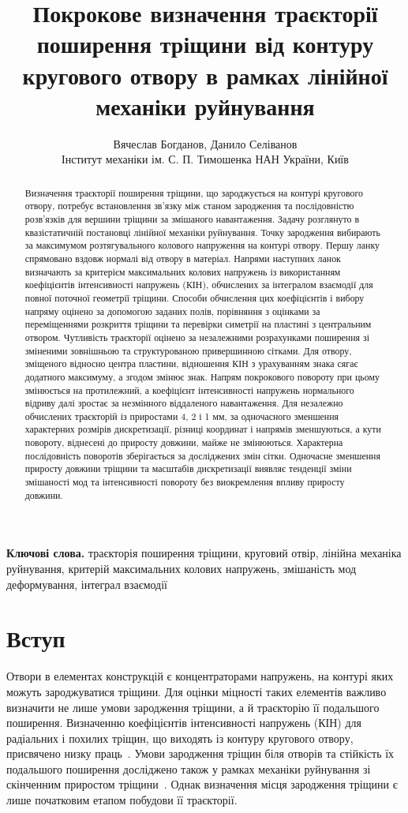 \documentclass[a4paper,12pt]{article}
\title{Покрокове визначення траєкторії поширення тріщини від контуру кругового отвору в рамках лінійної
механіки руйнування}
\author{Вячеслав Богданов, Данило Селіванов\\[4pt]
  \small Інститут механіки ім. С. П. Тимошенка НАН України, Київ}
\date{}
\begin{document}
\maketitle


\begin{abstract}
Визначення траєкторії поширення тріщини, що зароджується на контурі кругового отвору, потребує встановлення зв’язку між станом зародження та послідовністю розв’язків для вершини тріщини за змішаного навантаження. Задачу розглянуто в квазістатичній постановці лінійної механіки
руйнування. Точку зародження вибирають за максимумом розтягувального колового напруження на контурі отвору. Першу ланку спрямовано вздовж нормалі від отвору в матеріал. Напрями наступних
ланок визначають за критерієм максимальних колових напружень із використанням коефіцієнтів
інтенсивності напружень (КІН), обчислених за інтегралом взаємодії для повної поточної геометрії
тріщини. Способи обчислення цих коефіцієнтів і вибору напряму оцінено за допомогою заданих
полів, порівняння з оцінками за переміщеннями розкриття тріщини та перевірки симетрії на
пластині з центральним отвором. Чутливість траєкторії оцінено за незалежними розрахунками
поширення зі зміненими зовнішньою та структурованою привершинною сітками. Для отвору, зміщеного відносно центра пластини, відношення КІН з урахуванням знака сягає додатного максимуму, а згодом змінює знак.
Напрям покрокового повороту при цьому змінюється на протилежний, а коефіцієнт інтенсивності
напружень нормального відриву далі зростає за незмінного віддаленого навантаження. Для незалежно
обчислених траєкторій із приростами 4, 2 і 1 мм, за одночасного зменшення характерних
розмірів дискретизації, різниці координат і напрямів зменшуються, а кути повороту, віднесені до приросту довжини, майже не змінюються. Характерна послідовність поворотів зберігається за
досліджених змін сітки. Одночасне зменшення приросту довжини тріщини та масштабів дискретизації виявляє тенденції зміни змішаності мод та
інтенсивності повороту без виокремлення впливу приросту довжини.
\end{abstract}
\noindent\textbf{Ключові слова.} траєкторія поширення тріщини, круговий отвір, лінійна механіка руйнування, критерій максимальних
колових напружень, змішаність мод деформування, інтеграл взаємодії

\section{Вступ}
Отвори в елементах конструкцій є концентраторами напружень, на контурі яких можуть зароджуватися тріщини.
Для оцінки міцності таких елементів важливо визначити не лише умови зародження тріщини, а й траєкторію її подальшого поширення.
Визначенню коефіцієнтів інтенсивності напружень (КІН) для радіальних і похилих тріщин, що виходять із контуру кругового отвору,
присвячено низку праць~\cite{Bowie1956,WooWangCheung1989,XuEtAl2018}.
Умови зародження тріщин біля отворів та стійкість їх подальшого поширення досліджено також у рамках механіки руйнування
зі скінченним приростом тріщини~\cite{SaporaEtAl2018,SaporaCornetti2018}.
Однак визначення місця зародження тріщини є лише початковим етапом побудови її траєкторії.
\end{document}
